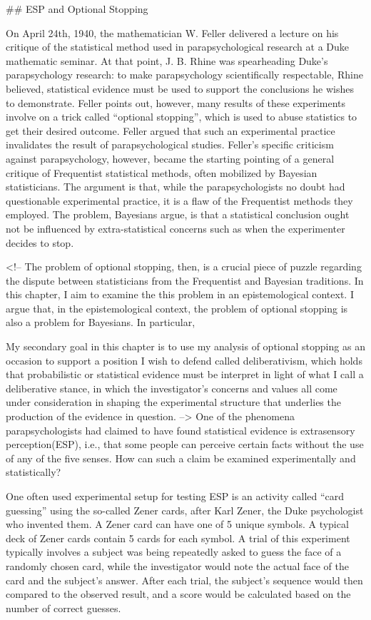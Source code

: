 \#\# ESP and Optional Stopping

On April 24th, 1940, the mathematician W. Feller delivered a lecture on
his critique of the statistical method used in parapsychological
research at a Duke mathematic seminar. At that point, J. B. Rhine was
spearheading Duke's parapsychology research: to make parapsychology
scientifically respectable, Rhine believed, statistical evidence must be
used to support the conclusions he wishes to demonstrate. Feller points
out, however, many results of these experiments involve on a trick
called ``optional stopping'', which is used to abuse statistics to get
their desired outcome. Feller argued that such an experimental practice
invalidates the result of parapsychological studies. Feller's specific
criticism against parapsychology, however, became the starting pointing
of a general critique of Frequentist statistical methods, often
mobilized by Bayesian statisticians. The argument is that, while the
parapsychologists no doubt had questionable experimental practice, it is
a flaw of the Frequentist methods they employed. The problem, Bayesians
argue, is that a statistical conclusion ought not be influenced by
extra-statistical concerns such as when the experimenter decides to
stop.

\textless{}!-- The problem of optional stopping, then, is a crucial
piece of puzzle regarding the dispute between statisticians from the
Frequentist and Bayesian traditions. In this chapter, I aim to examine
the this problem in an epistemological context. I argue that, in the
epistemological context, the problem of optional stopping is also a
problem for Bayesians. In particular,

My secondary goal in this chapter is to use my analysis of optional
stopping as an occasion to support a position I wish to defend called
deliberativism, which holds that probabilistic or statistical evidence
must be interpret in light of what I call a deliberative stance, in
which the investigator's concerns and values all come under
consideration in shaping the experimental structure that underlies the
production of the evidence in question. --\textgreater{} One of the
phenomena parapsychologists had claimed to have found statistical
evidence is extrasensory perception(ESP), i.e., that some people can
perceive certain facts without the use of any of the five senses. How
can such a claim be examined experimentally and statistically?

One often used experimental setup for testing ESP is an activity called
``card guessing'' using the so-called Zener cards, after Karl Zener, the
Duke psychologist who invented them. A Zener card can have one of 5
unique symbols. A typical deck of Zener cards contain 5 cards for each
symbol. A trial of this experiment typically involves a subject was
being repeatedly asked to guess the face of a randomly chosen card,
while the investigator would note the actual face of the card and the
subject's answer. After each trial, the subject's sequence would then
compared to the observed result, and a score would be calculated based
on the number of correct guesses.

